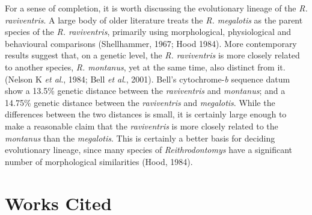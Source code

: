\documentclass[a4paper]{article}
\begin{document}
For a sense of completion, it is worth discussing the evolutionary lineage of the \textit{R. raviventris}. A large body of older literature treats the \textit{R. megalotis} as the parent species of the \textit{R. raviventris}, primarily using morphological, physiological and behavioural comparisons (Shellhammer, 1967; Hood 1984). More contemporary results suggest that, on a genetic level, the \textit{R. raviventris} is more closely related to another species, \textit{R. montanus}, yet at the same time, also distinct from it. (Nelson K \textit{et al}., 1984; Bell \textit{et al}., 2001). Bell's cytochrome-\textit{b} sequence datum show a 13.5\% genetic distance between the \textit{raviventris} and \textit{montanus}; and a 14.75\% genetic distance between the \textit{raviventris} and \textit{megalotis}. While the differences between the two distances is small, it is certainly large enough to make a reasonable claim that the \textit{raviventris} is more closely related to the \textit{montanus} than the \textit{megalotis}. This is certainly a better basis for deciding evolutionary lineage, since many species of \textit{Reithrodontomys} have a significant number of morphological similarities (Hood, 1984).

\section*{Works Cited}
\end{document}
